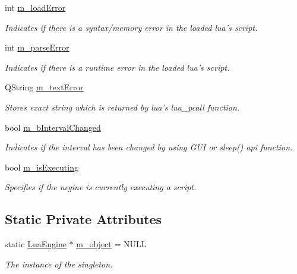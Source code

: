 \begin{DoxyCompactItemize}
int \hyperlink{class_lua_engine_af8dca74620280060399b5b7dd937af44}{m\-\_\-load\-Error}
\begin{DoxyCompactList}\small\item\em Indicates if there is a syntax/memory error in the loaded lua's script. \end{DoxyCompactList}\item 
int \hyperlink{class_lua_engine_ac7c65e343f73a0dadcbe2d5f1a5842f3}{m\-\_\-parse\-Error}
\begin{DoxyCompactList}\small\item\em Indicates if there is a runtime error in the loaded lua's script. \end{DoxyCompactList}\item 
Q\-String \hyperlink{class_lua_engine_a0cb5dc043a3f9b162ad97245cd7e6956}{m\-\_\-text\-Error}
\begin{DoxyCompactList}\small\item\em Stores exact string which is returned by lua's lua\-\_\-pcall function. \end{DoxyCompactList}\item 
bool \hyperlink{class_lua_engine_add74083d158ee3543d0644c0b6349c5d}{m\-\_\-b\-Interval\-Changed}
\begin{DoxyCompactList}\small\item\em Indicates if the interval has been changed by using G\-U\-I or sleep() api function. \end{DoxyCompactList}\item 
bool \hyperlink{class_lua_engine_ad2bf267f4030d958e5a6f88a3a19e039}{m\-\_\-is\-Executing}
\begin{DoxyCompactList}\small\item\em Specifies if the negine is currently executing a script. \end{DoxyCompactList}\end{DoxyCompactItemize}
\subsection*{Static Private Attributes}
\begin{DoxyCompactItemize}
\item 
static \hyperlink{class_lua_engine}{Lua\-Engine} $\ast$ \hyperlink{class_lua_engine_a27899d8e22a8da3067519562500b9c7f}{m\-\_\-object} = N\-U\-L\-L
\begin{DoxyCompactList}\small\item\em The instance of the singleton. \end{DoxyCompactList}\end{DoxyCompactItemize}


